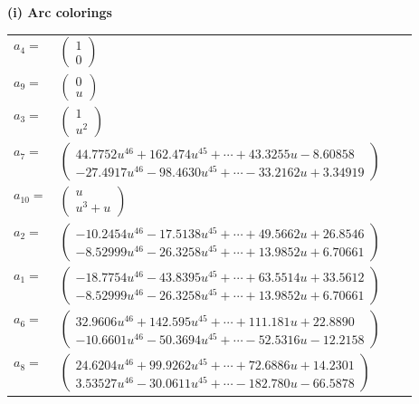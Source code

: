 \documentclass[1p]{elsarticle_modified}
\theoremstyle{definition}
\begin{document}
\flushleft \textbf{(i) Arc colorings}\\
\begin{tabular}{m{7pt} m{180pt} m{7pt} m{180pt} }
\flushright $a_{4}=$&$\begin{pmatrix}1\\0\end{pmatrix}$ \\
\flushright $a_{9}=$&$\begin{pmatrix}0\\u\end{pmatrix}$ \\
\flushright $a_{3}=$&$\begin{pmatrix}1\\u^2\end{pmatrix}$ \\
\flushright $a_{7}=$&$\begin{pmatrix}44.7752 u^{46}+162.474 u^{45}+\cdots+43.3255 u-8.60858\\-27.4917 u^{46}-98.4630 u^{45}+\cdots-33.2162 u+3.34919\end{pmatrix}$ \\
\flushright $a_{10}=$&$\begin{pmatrix}u\\u^3+u\end{pmatrix}$ \\
\flushright $a_{2}=$&$\begin{pmatrix}-10.2454 u^{46}-17.5138 u^{45}+\cdots+49.5662 u+26.8546\\-8.52999 u^{46}-26.3258 u^{45}+\cdots+13.9852 u+6.70661\end{pmatrix}$ \\
\flushright $a_{1}=$&$\begin{pmatrix}-18.7754 u^{46}-43.8395 u^{45}+\cdots+63.5514 u+33.5612\\-8.52999 u^{46}-26.3258 u^{45}+\cdots+13.9852 u+6.70661\end{pmatrix}$ \\
\flushright $a_{6}=$&$\begin{pmatrix}32.9606 u^{46}+142.595 u^{45}+\cdots+111.181 u+22.8890\\-10.6601 u^{46}-50.3694 u^{45}+\cdots-52.5316 u-12.2158\end{pmatrix}$ \\
\flushright $a_{8}=$&$\begin{pmatrix}24.6204 u^{46}+99.9262 u^{45}+\cdots+72.6886 u+14.2301\\3.53527 u^{46}-30.0611 u^{45}+\cdots-182.780 u-66.5878\end{pmatrix}$ \\

\end{tabular}
\end{document}
